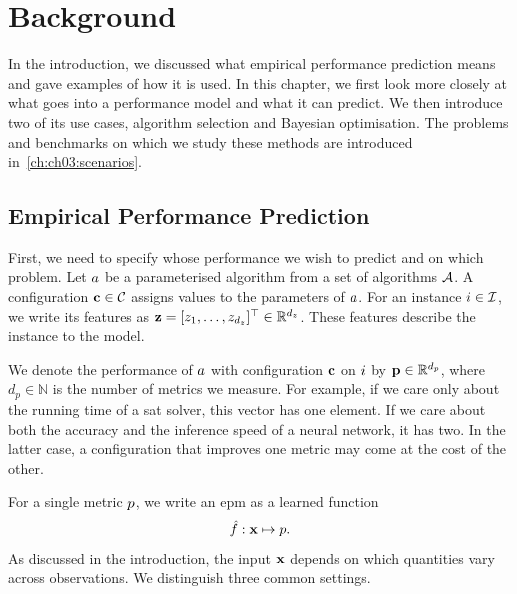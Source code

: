 
\chapter{Background}\label{ch:ch02:background}

In the introduction, we discussed what empirical performance prediction means and gave examples of how it is used. In this chapter, we first look more closely at what goes into a performance model and what it can predict. We then introduce two of its use cases, algorithm selection and Bayesian optimisation. The problems and benchmarks on which we study these methods are introduced in~\cref{ch:ch03:scenarios}.

\section{Empirical Performance Prediction}
\label{sec:ch02:empirical_performance_prediction}

First, we need to specify whose performance we wish to predict and on which problem. Let $a$ be a parameterised algorithm from a set of algorithms $\mathcal{A}$. A configuration $\mathbf{c}\in\mathcal{C}$ assigns values to the parameters of $a$. For an instance $i\in\mathcal{I}$, we write its features as $\mathbf{z} = [z_1, \ldots, z_{d_z}]^{\top} \in \mathbb{R}^{d_z}$. These features describe the instance to the model.

We denote the performance of $a$ with configuration $\mathbf{c}$ on $i$ by $\mathbf{p} \in \mathbb R^{d_p}$, where $d_p \in \mathbb N$ is the number of metrics we measure. For example, if we care only about the running time of a \gls{sat} solver, this vector has one element. If we care about both the accuracy and the inference speed of a neural network, it has two. In the latter case, a configuration that improves one metric may come at the cost of the other.

For a single metric $p$, we write an \gls{epm} as a learned function
\begin{equation}
  \hat{f} : \mathbf{x} \mapsto p.
\end{equation}
As discussed in the introduction, the input $\mathbf{x}$ depends on which quantities vary across observations. We distinguish three common settings.

